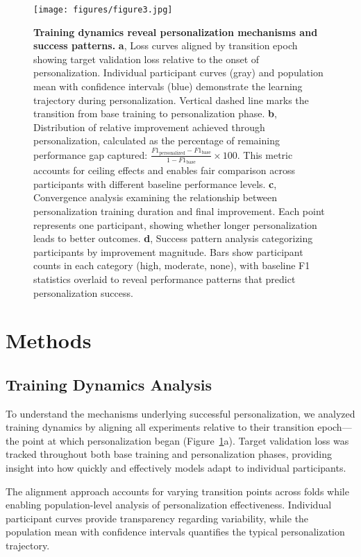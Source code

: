 \documentclass[11pt]{article}
\begin{document}
\begin{figure}[htbp]
    \centering
    \texttt{[image: figures/figure3.jpg]}
    \caption{\textbf{Training dynamics reveal personalization mechanisms and success patterns.}
    \textbf{a}, Loss curves aligned by transition epoch showing target validation loss relative to the onset of personalization. Individual participant curves (gray) and population mean with confidence intervals (blue) demonstrate the learning trajectory during personalization. Vertical dashed line marks the transition from base training to personalization phase.
    \textbf{b}, Distribution of relative improvement achieved through personalization, calculated as the percentage of remaining performance gap captured: $\frac{F1_{\text{personalized}} - F1_{\text{base}}}{1 - F1_{\text{base}}} \times 100$. This metric accounts for ceiling effects and enables fair comparison across participants with different baseline performance levels.
    \textbf{c}, Convergence analysis examining the relationship between personalization training duration and final improvement. Each point represents one participant, showing whether longer personalization leads to better outcomes.
    \textbf{d}, Success pattern analysis categorizing participants by improvement magnitude. Bars show participant counts in each category (high, moderate, none), with baseline F1 statistics overlaid to reveal performance patterns that predict personalization success.}
    \label{fig:training_dynamics}
\end{figure}

\section{Methods}

\subsection{Training Dynamics Analysis}

To understand the mechanisms underlying successful personalization, we analyzed training dynamics by aligning all experiments relative to their transition epoch—the point at which personalization began (Figure~\ref{fig:training_dynamics}a). Target validation loss was tracked throughout both base training and personalization phases, providing insight into how quickly and effectively models adapt to individual participants.

The alignment approach accounts for varying transition points across folds while enabling population-level analysis of personalization effectiveness. Individual participant curves provide transparency regarding variability, while the population mean with confidence intervals quantifies the typical personalization trajectory.
\end{document}
